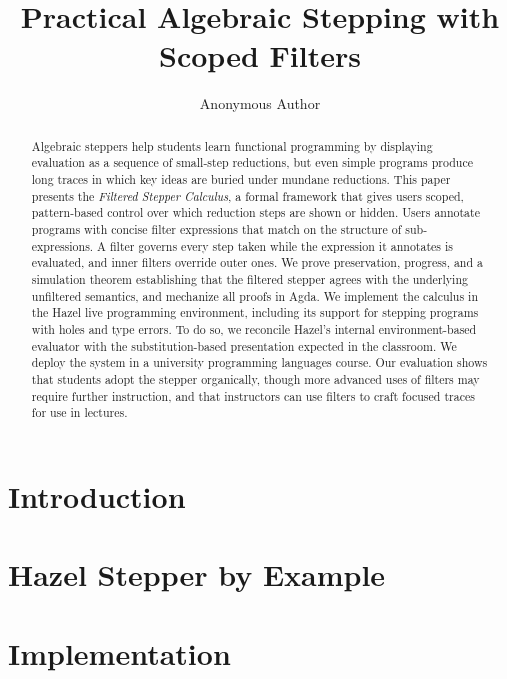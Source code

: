 \documentclass[a4paper,USenglish,anonymous,autoref]{lipics-v2021}
\title{Practical Algebraic Stepping with Scoped Filters}
\author{Anonymous Author}{Anonymous Institution}{}{}{}
\begin{document}
\maketitle

\begin{abstract}
  Algebraic steppers help students learn functional programming by
  displaying evaluation as a sequence of small-step reductions, but
  even simple programs produce long traces in which key ideas are
  buried under mundane reductions. This paper presents the
  \emph{Filtered Stepper Calculus}, a formal framework that gives
  users scoped, pattern-based control over which reduction steps are
  shown or hidden. Users annotate programs with concise filter
  expressions that match on the structure of sub-expressions. A filter
  governs every step taken while the expression it annotates is evaluated,
  and inner filters override outer ones. We
  prove preservation, progress, and a simulation theorem establishing
  that the filtered stepper agrees with the underlying unfiltered
  semantics, and mechanize all proofs in Agda. We implement the
  calculus in the Hazel live programming environment, including its support for stepping programs with holes and type errors. To do so, we reconcile
  Hazel's internal environment-based evaluator with the
  substitution-based presentation expected in the classroom. We 
  deploy the system in a university programming languages course. Our
  evaluation shows that students adopt the stepper organically, though more advanced uses of filters may require further instruction, and
  that instructors can use filters to craft focused traces for
  use in lectures.
\end{abstract}

\section{Introduction}\label{sec:intro}



\section{Hazel Stepper by Example}\label{sec:examples}





\section{Implementation}\label{sec:implementation}
\end{document}
